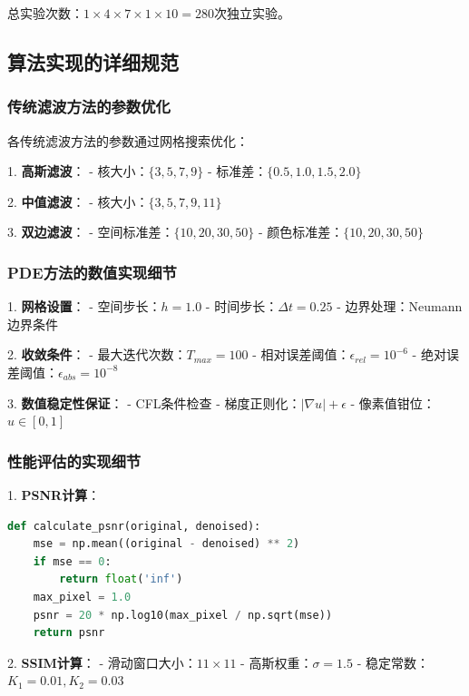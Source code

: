 \documentclass[a4paper,12pt]{ctexart}
\begin{document}
总实验次数：$1 \times 4 \times 7 \times 1 \times 10 = 280$次独立实验。

\subsection{算法实现的详细规范}

\subsubsection{传统滤波方法的参数优化}

各传统滤波方法的参数通过网格搜索优化：

1. \textbf{高斯滤波}：
   - 核大小：$\{3, 5, 7, 9\}$
   - 标准差：$\{0.5, 1.0, 1.5, 2.0\}$

2. \textbf{中值滤波}：
   - 核大小：$\{3, 5, 7, 9, 11\}$

3. \textbf{双边滤波}：
   - 空间标准差：$\{10, 20, 30, 50\}$
   - 颜色标准差：$\{10, 20, 30, 50\}$

\subsubsection{PDE方法的数值实现细节}

1. \textbf{网格设置}：
   - 空间步长：$h = 1.0$
   - 时间步长：$\Delta t = 0.25$
   - 边界处理：Neumann边界条件

2. \textbf{收敛条件}：
   - 最大迭代次数：$T_{max} = 100$
   - 相对误差阈值：$\epsilon_{rel} = 10^{-6}$
   - 绝对误差阈值：$\epsilon_{abs} = 10^{-8}$

3. \textbf{数值稳定性保证}：
   - CFL条件检查
   - 梯度正则化：$|\nabla u| + \epsilon$
   - 像素值钳位：$u \in [0,1]$

\subsubsection{性能评估的实现细节}

1. \textbf{PSNR计算}：
\begin{lstlisting}[language=Python, caption=PSNR计算函数]
def calculate_psnr(original, denoised):
    mse = np.mean((original - denoised) ** 2)
    if mse == 0:
        return float('inf')
    max_pixel = 1.0  
    psnr = 20 * np.log10(max_pixel / np.sqrt(mse))
    return psnr
\end{lstlisting}

2. \textbf{SSIM计算}：
   - 滑动窗口大小：$11 \times 11$
   - 高斯权重：$\sigma = 1.5$
   - 稳定常数：$K_1 = 0.01, K_2 = 0.03$
\end{document}
